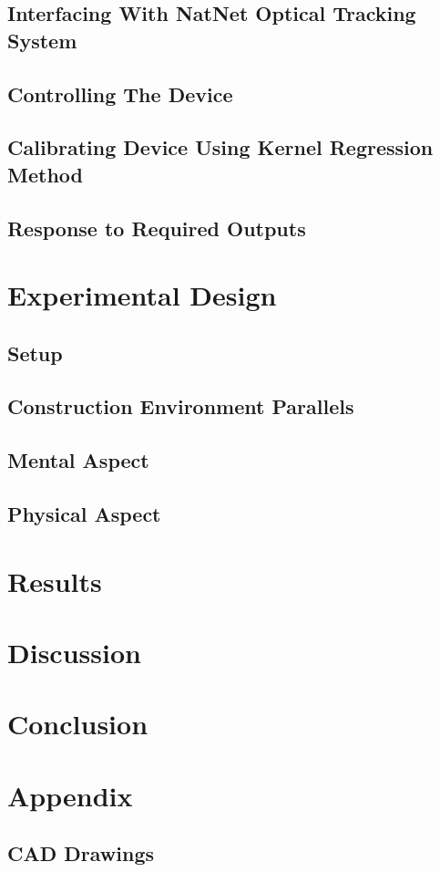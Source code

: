 \documentclass[11pt]{article}
\begin{document}
\subsection{Interfacing With NatNet Optical Tracking System}
\subsection{Controlling The Device}
\subsection{Calibrating Device Using Kernel Regression Method}
\subsection{Response to Required Outputs}

\section{Experimental Design}
\subsection{Setup}
\subsection{Construction Environment Parallels}
\subsection{Mental Aspect}
\subsection{Physical Aspect}

\section{Results}

\section{Discussion}
\section{Conclusion}




\section{Appendix}
\subsection{CAD Drawings}
\end{document}

